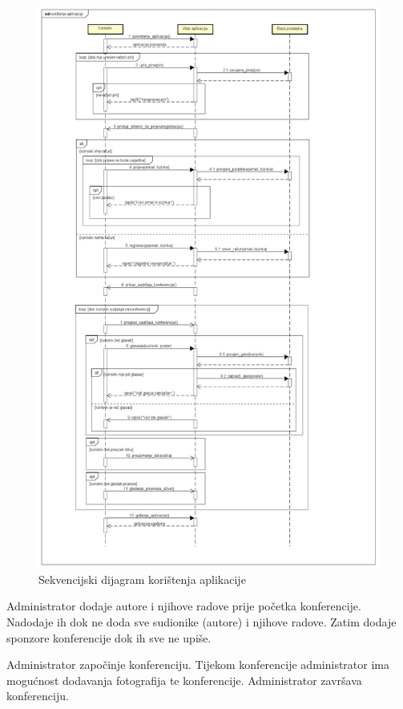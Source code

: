 				\begin{figure}[H]
					\includegraphics[scale=0.28]{slike/koristenje_aplikacije.JPG} %
					\centering
					\caption{Sekvencijski dijagram korištenja aplikacije}
					\label{fig:promjene}
				\end{figure}

				Administrator dodaje autore i njihove radove prije početka konferencije. Nadodaje ih dok ne doda sve sudionike (autore) i njihove radove.
				Zatim dodaje sponzore konferencije dok ih sve ne upiše.

				Administrator započinje konferenciju. Tijekom konferencije administrator ima mogućnost dodavanja fotografija te konferencije. Administrator završava konferenciju. 

